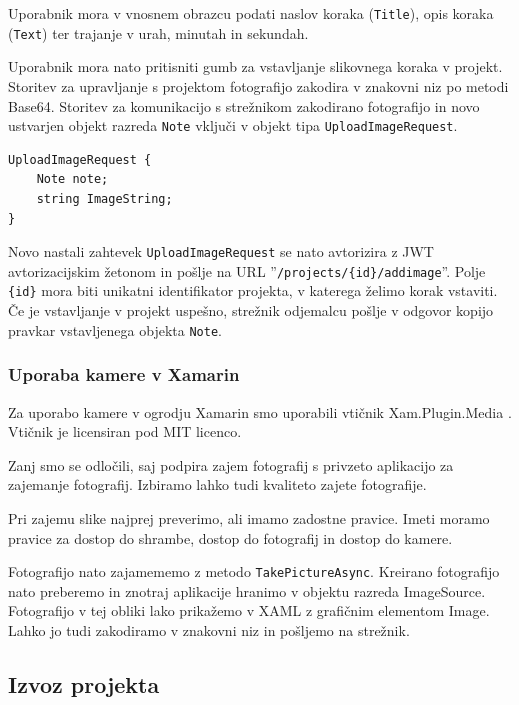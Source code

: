 \documentclass[a4paper, 12pt]{book}
\begin{document}
Uporabnik mora v vnosnem obrazcu podati naslov koraka (\texttt{Title}), opis koraka (\texttt{Text}) ter trajanje v urah, minutah in sekundah.

Uporabnik mora nato pritisniti gumb za vstavljanje slikovnega koraka v projekt.
Storitev za upravljanje s projektom fotografijo zakodira v znakovni niz po metodi Base64.
Storitev za komunikacijo s strežnikom zakodirano fotografijo in novo ustvarjen objekt razreda \texttt{Note} vključi v objekt tipa \texttt{UploadImageRequest}.

\begin{Verbatim}[commandchars=+\[\]]
UploadImageRequest {
    Note note;
    string ImageString; 
}
\end{Verbatim}

Novo nastali zahtevek \texttt{UploadImageRequest} se nato avtorizira z JWT avtorizacijskim žetonom in pošlje na URL ''\texttt{/projects/\{id\}/addimage}''.
Polje \texttt{\{id\}} mora biti unikatni identifikator projekta, v katerega želimo korak vstaviti.
Če je vstavljanje v projekt uspešno, strežnik odjemalcu pošlje v odgovor kopijo pravkar vstavljenega objekta \texttt{Note}.


\subsubsection{Uporaba kamere v Xamarin}


Za uporabo kamere v ogrodju Xamarin smo uporabili vtičnik Xam.Plugin.Media \cite{xampluginmedia}.
Vtičnik je licensiran pod MIT licenco.

Zanj smo se odločili, saj podpira zajem fotografij s privzeto aplikacijo za zajemanje fotografij.
Izbiramo lahko tudi kvaliteto zajete fotografije.

Pri zajemu slike najprej preverimo, ali imamo zadostne pravice.
Imeti moramo pravice za dostop do shrambe, dostop do fotografij in dostop do kamere.

Fotografijo nato zajamememo z metodo \texttt{TakePictureAsync}.
Kreirano fotografijo nato preberemo in znotraj aplikacije hranimo v objektu razreda ImageSource.
Fotografijo v tej obliki lako prikažemo v XAML z grafičnim elementom Image.
Lahko jo tudi zakodiramo v znakovni niz in pošljemo na strežnik.


\subsection{Izvoz projekta}
\end{document}
